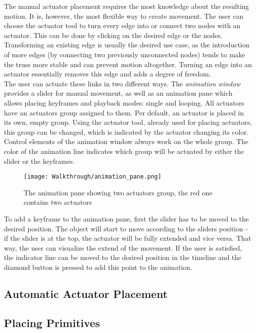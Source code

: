 The manual actuator placement requires the most knowledge about the resulting motion. It is, however, the most flexible way to create movement. The user can choose the actuator tool to turn every edge into or connect two nodes with an actuator. This can be done by clicking on the desired edge or the nodes. Transforming an existing edge is usually the desired use case, as the introduction of more edges (by connecting two previously unconnected nodes) tends to make the truss more stable and can prevent motion altogether. Turning an edge into an actuator essentially removes this edge and adds a degree of freedom.\\
The user can actuate these links in two different ways. The \textit{animation window} provides a slider for manual movement, as well as an animation pane which allows placing keyframes and playback modes: single and looping. All actuators have an actuators group assigned to them. Per default, an actuator is placed in its own, empty group. Using the actuator tool, already used for placing actuators, this group can be changed, which is indicated by the actuator changing its color.\\
Control elements of the animation window always work on the whole group. The color of the animation line indicates which group will be actuated by either the slider or the keyframes.
\begin{figure}[h!]
    \texttt{[image: Walkthrough/animation\_pane.png]}
    \centering
    \caption{The animation pane showing two actuators group, the red one contains two actuators}
    \label{fig:animation_pane}
\end{figure}
To add a keyframe to the animation pane, first the slider has to be moved to the desired position. The object will start to move according to the sliders position - if the slider is at the top, the actuator will be fully extended and vice versa. That way, the user can visualize the extend of the movement. If the user is satisfied, the indicator line can be moved to the desired position in the timeline and the diamond button is pressed to add this point to the animation.

\subsection{Automatic Actuator Placement}

\subsection{Placing Primitives}

